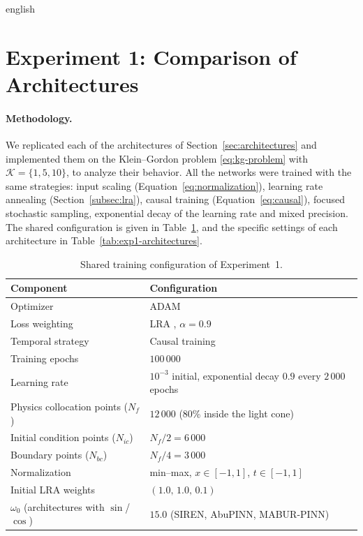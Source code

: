 \documentclass[0000.tex]{subfiles}
\begin{document}
\begin{hyphenrules}{english}
\section{Experiment 1: Comparison of Architectures}\label{sec:exp-architectures}

\paragraph{Methodology.}
We replicated each of the architectures of Section~\ref{sec:architectures} and implemented them on the
Klein--Gordon problem \eqref{eq:kg-problem} with $\mathcal{K}=\{1,5,10\}$, to analyze their behavior. All
the networks were trained with the same strategies: input scaling (Equation~\eqref{eq:normalization}), learning rate
annealing (Section~\ref{subsec:lra}), causal training (Equation~\eqref{eq:causal}), focused stochastic sampling, exponential
decay of the learning rate and mixed precision. The shared configuration is given in
Table~\ref{tab:exp1-config}, and the specific settings of each architecture in Table~\ref{tab:exp1-architectures}.

\begin{table}[htbp]
  \centering
  \caption{Shared training configuration of Experiment~1.}
  \label{tab:exp1-config}
  \small
  \begin{tabular}{@{}ll@{}}
    \toprule
    Component & Configuration \\
    \midrule
    Optimizer & ADAM \cite{kingma2015} \\
    Loss weighting & LRA \cite{wang2021gradient}, $\alpha=0.9$ \\
    Temporal strategy & Causal training \cite{wang2024causality} \\
    Training epochs & $100\,000$ \\
    Learning rate & $10^{-3}$ initial, exponential decay $0.9$ every $2\,000$ epochs \\
    Physics collocation points ($N_f$) & $12\,000$ (80\% inside the light cone) \\
    Initial condition points ($N_{ic}$) & $N_f/2=6\,000$ \\
    Boundary points ($N_{bc}$) & $N_f/4=3\,000$ \\
    Normalization & min--max, $x\in[-1,1]$, $t\in[-1,1]$ \\
    Initial LRA weights & $(1.0,\,1.0,\,0.1)$ \\
    $\omega_0$ (architectures with $\sin$/$\cos$) & $15.0$ (SIREN, AbuPINN, MABUR-PINN) \\
    \bottomrule
  \end{tabular}
\end{table}


\end{hyphenrules}
\end{document}
